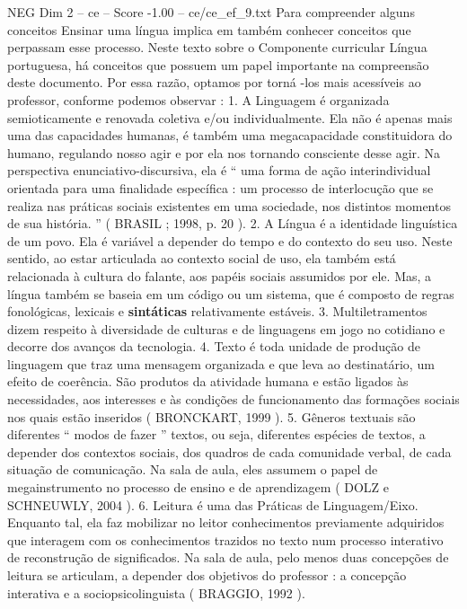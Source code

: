 \begin{textsample}{NEG Dim 2 – ce – Score -1.00 – ce/ce\_ef\_9.txt}  \label{ex:f2_neg_201}
Para compreender alguns conceitos Ensinar uma língua implica em também conhecer conceitos que perpassam esse processo.
Neste texto sobre o Componente curricular Língua portuguesa, há conceitos que possuem um papel importante na compreensão deste documento.
Por essa razão, optamos por torná -los mais acessíveis ao professor, conforme podemos observar : 1.
A Linguagem é organizada semioticamente e renovada coletiva e/ou individualmente.
Ela não é apenas mais uma das capacidades humanas, é também uma megacapacidade constituidora do humano, regulando nosso agir e por ela nos tornando consciente desse agir.
Na perspectiva enunciativo-discursiva, ela é “ uma forma de ação interindividual orientada para uma finalidade específica : um processo de interlocução que se realiza nas práticas sociais existentes em uma sociedade, nos distintos momentos de sua história. ” ( BRASIL ; 1998, p. 20 ). 2.
A Língua é a identidade linguística de um povo.
Ela é variável a depender do tempo e do contexto do seu uso.
Neste sentido, ao estar articulada ao contexto social de uso, ela também está relacionada à cultura do falante, aos papéis sociais assumidos por ele.
Mas, a língua também se baseia em um código ou um sistema, que é composto de regras fonológicas, lexicais e \textbf{sintáticas} relativamente estáveis. 3.
Multiletramentos dizem respeito à diversidade de culturas e de linguagens em jogo no cotidiano e decorre dos avanços da tecnologia. 4.
Texto é toda unidade de produção de linguagem que traz uma mensagem organizada e que leva ao destinatário, um efeito de coerência.
São produtos da atividade humana e estão ligados às necessidades, aos interesses e às condições de funcionamento das formações sociais nos quais estão inseridos ( BRONCKART, 1999 ). 5.
Gêneros textuais são diferentes “ modos de fazer ” textos, ou seja, diferentes espécies de textos, a depender dos contextos sociais, dos quadros de cada comunidade verbal, de cada situação de comunicação.
Na sala de aula, eles assumem o papel de megainstrumento no processo de ensino e de aprendizagem ( DOLZ e SCHNEUWLY, 2004 ). 6.
Leitura é uma das Práticas de Linguagem/Eixo.
Enquanto tal, ela faz mobilizar no leitor conhecimentos previamente adquiridos que interagem com os conhecimentos trazidos no texto num processo interativo de reconstrução de significados.
Na sala de aula, pelo menos duas concepções de leitura se articulam, a depender dos objetivos do professor : a concepção interativa e a sociopsicolinguista ( BRAGGIO, 1992 ).

\end{textsample}
